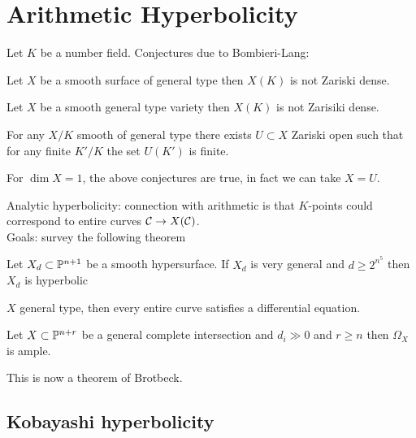 \documentclass[12pt]{article}
\begin{document}
\section{Arithmetic Hyperbolicity}

Let $K$ be a number field. Conjectures due to Bombieri-Lang:

\begin{conj}
Let $X$ be a smooth surface of general type then $X(K)$ is not Zariski dense.
\end{conj}

\begin{conj}
Let $X$ be a smooth general type variety then $X(K)$ is not Zarisiki dense.
\end{conj}

\begin{conj}
For any $X / K$ smooth of general type there exists $U \subset X$ Zariski open such that for any finite $K'/K$ the set $U(K')$ is finite. 
\end{conj}

\begin{theorem}[Faltings]
For $\dim{X} = 1$, the above conjectures are true, in fact we can take $X = U$.
\end{theorem}

Analytic hyperbolicity: connection with arithmetic is that $K$-points could correspond to entire curves $\C \to X(\C)$.
\\
Goals: survey the following theorem

\begin{theorem}
Let $X_d \subset \P^{n+1}$ be a smooth hypersurface. If $X_d$ is very general and $d \ge 2^{n^5}$ then $X_d$ is hyperbolic
\end{theorem}

\begin{rmk}
$X$ general type, then every entire curve satisfies a differential equation. 
\end{rmk}

\begin{conj}
Let $X \subset \P^{n+r}$ be a general complete intersection and $d_i \gg 0$ and $r \ge n$ then $\Omega_X$ is ample. 
\end{conj}

This is now a theorem of Brotbeck.

\subsection{Kobayashi hyperbolicity}
\end{document}
